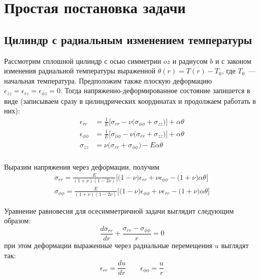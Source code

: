 \chapter{Простая постановка задачи}\label{ch:ch10}

\section{Цилиндр с радиальным изменением температуры}\label{sec:ch10/sec1}

Рассмотрим сплошной цилиндр с осью симметрии \(oz\) и радиусом \(b\) и с законом изменения радиальной температуры выраженной \(\theta(r)=T(r)-T_0\), где \(T_0\)~--- начальная температура. Предположим также плоскую деформацию \(\epsilon_{zz}=\epsilon_{rz}=\epsilon_{\phi z}=0\). Тогда напряженно-деформированное состояние запишется в виде (записываем сразу в цилиндрических координатах и продолжаем работать в них):
\begin{equation}
	\label{eq:ch10:equation1}
\begin{split}
	\epsilon_{rr} &= \frac{1}{E} \big [\sigma_{rr} - \nu \big(\sigma_{\phi\phi} + \sigma_{zz}\big) \big] + \alpha \theta \\
	\epsilon_{\phi\phi} &= \frac{1}{E} \big [\sigma_{\phi\phi} - \nu \big(\sigma_{rr} + \sigma_{zz}\big) \big] + \alpha \theta \\
	\sigma_{zz} &= \nu \big(\sigma_{rr} + \sigma_{\phi\phi}\big) - E\alpha\theta \\
\end{split}
\end{equation}	

Выразим напряжения через деформации, получим
\begin{equation}
	\label{eq:ch10:equation2}
	\begin{split}
		\sigma_{rr} = \frac{E}{(1+\nu)(1-2\nu)} \big[\big(1-\nu \big)\epsilon_{rr} + \nu\epsilon_{\phi\phi} - \big(1+\nu\big )\alpha\theta\big] \\
		\sigma_{\phi\phi} = \frac{E}{(1+\nu)(1-2\nu)} \big[\big(1-\nu \big)\epsilon_{\phi\phi} + \nu\epsilon_{rr} - \big(1+\nu\big )\alpha\theta\big] 
	\end{split}
\end{equation}

Уравнение равновесия для осесимметричной задачи выглядит следующим образом:
\begin{equation}
	\label{eq:ch10:equation3}
		\frac {d\sigma_{rr} }{dr} + \frac {\sigma_{rr}-\sigma_{\phi\phi}}{r}=0
\end{equation}
при этом деформации выраженные через радиальные перемещения \(u\) выглядят так:
\begin{equation}
	\label{eq:ch10:equation4}
	\epsilon_{rr} = \frac{du}{dr} \qquad \epsilon_{\phi\phi} = \frac{u}{r}
\end{equation}

